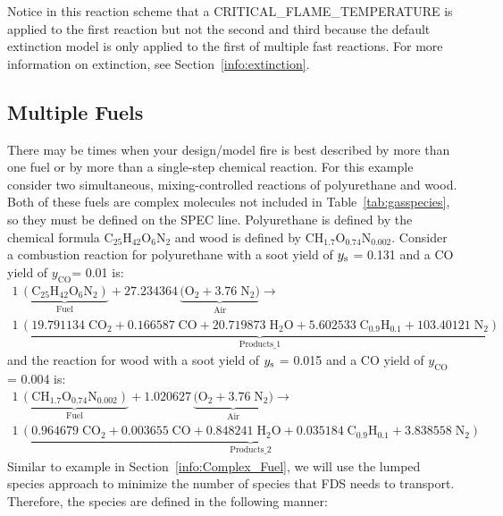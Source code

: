 \documentclass[11pt]{book}
\begin{document}
Notice in this reaction scheme that a {\ct CRITICAL\_FLAME\_TEMPERATURE} is applied to the first reaction but not the second and third because the default extinction model is only applied to the first of multiple fast reactions. For more information on extinction, see Section~\ref{info:extinction}.



\subsection{Multiple Fuels}
\label{info:multi-reac}
\label{energy_budget_adiabatic_two_fuels}

There may be times when your design/model fire is best described by more than one fuel or by more than a single-step chemical reaction. For this example consider two simultaneous, mixing-controlled reactions of polyurethane and wood. Both of these fuels are complex molecules not included in Table~\ref{tab:gasspecies}, so they must be defined on the {\ct SPEC line}. Polyurethane is defined by the chemical formula C$_{25}$H$_{42}$O$_{6}$N$_{2}$ and wood is defined by CH$_{1.7}$O$_{0.74}$N$_{0.002}$. Consider a combustion reaction for polyurethane with a soot yield of $y_{\rm s}$ = 0.131 and a CO yield of $y_{\mathrm{CO}}$= 0.01 \cite{SFPE:Tewarson} is:
\begin{multline}\label{eq:pu_combust}
1\,\underbrace{\mathrm{(C_{25}H_{42}O_{6}N_{2})}}_\text{Fuel} + 27.234364\,\underbrace{\mathrm{(O_2 + 3.76 \; N_2})}_\text{Air} \longrightarrow \\
1\,\underbrace{\mathrm{(19.791134\; CO_2 + 0.166587 \; CO + 20.719873 \; H_2O + 5.602533\; C_{0.9}H_{0.1} + 103.40121 \; N_2)}}_\text{Products\_1}
\end{multline}
and the reaction for wood with a soot yield of $y_{\rm s}$ = 0.015 and a CO yield of $y_{\mathrm{CO}}$= 0.004 \cite{SFPE:Tewarson} is:
\begin{multline}\label{eq:wood_combust}
1\,\underbrace{\mathrm{(CH_{1.7}O_{0.74}N_{0.002})}}_\text{Fuel} + 1.020627\,\underbrace{\mathrm{(O_2 + 3.76 \; N_2})}_\text{Air} \longrightarrow \\
1\,\underbrace{\mathrm{(0.964679\; CO_2 + 0.003655 \; CO + 0.848241 \; H_2O + 0.035184\; C_{0.9}H_{0.1} + 3.838558 \; N_2)}}_\text{Products\_2}
\end{multline}
Similar to example in Section~\ref{info:Complex_Fuel}, we will use the lumped species approach to minimize the number of species that FDS needs to transport. Therefore, the species are defined in the following manner:
\end{document}
